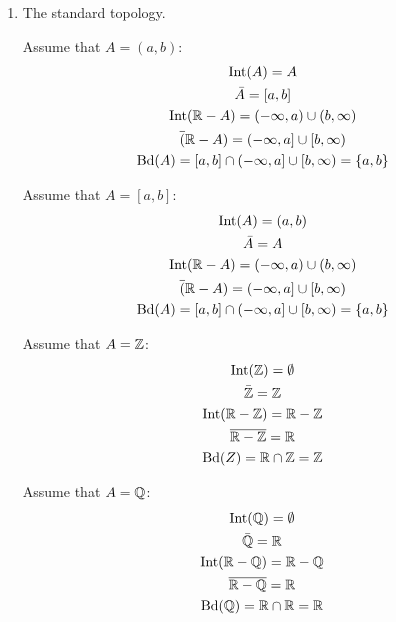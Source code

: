\documentclass[letterpaper,12pt,fleqn]{article}
\DeclareMathOperator{\Int}{Int}
\DeclareMathOperator{\Bd}{Bd}
\begin{document}
\begin{example}
\begin{enumerate}
    Assume that \(A=\Z\):
    \begin{gather*}
      \Int(\Z)=\emptyset\\
      \bar{\Z}=\R \\
      \Int(\R-\Z)=\emptyset \\
      \overline{\R-\Z}=\R \\
      \Bd(Z)=\R\cap\R=\R
    \end{gather*}

  \item The standard topology.

    Assume that \(A=(a,b)\):
    \begin{gather*}
      \Int(A)=A \\
      \bar{A}=[a,b] \\
      \Int(\R-A)=(-\infty,a)\cup(b,\infty) \\
      \overline(\R-A)=(-\infty,a]\cup[b,\infty) \\
      \Bd(A)=[a,b]\cap(-\infty,a]\cup[b,\infty)=\set{a,b} \\
    \end{gather*}

    Assume that \(A=[a,b]\):
    \begin{gather*}
      \Int(A)=(a,b) \\
      \bar{A}=A \\
      \Int(\R-A)=(-\infty,a)\cup(b,\infty) \\
      \overline(\R-A)=(-\infty,a]\cup[b,\infty) \\
      \Bd(A)=[a,b]\cap(-\infty,a]\cup[b,\infty)=\set{a,b} \\
    \end{gather*}

    Assume that \(A=\Z\):
    \begin{gather*}
      \Int(\Z)=\emptyset \\
      \bar{\Z}=\Z \\
      \Int(\R-\Z)=\R-\Z \\
      \overline{\R-\Z}=\R \\
      \Bd(Z)=\R\cap\Z=\Z
    \end{gather*}

    Assume that \(A=\mathbb{Q}\):
    \begin{gather*}
      \Int(\Q)=\emptyset \\
      \bar{\Q}=\R \\
      \Int(\R-\Q)=\R-\Q \\
      \overline{\R-\Q}=\R \\
      \Bd(\Q)=\R\cap\R=\R
    \end{gather*}
  \end{enumerate}
\end{example}
\end{document}
